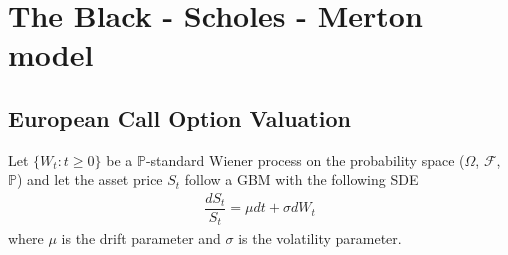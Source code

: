 \chapter{The Black - Scholes - Merton model}


\section{European Call Option Valuation}
\fontsize{11pt}{20pt}\selectfont Let $\{W_t : t\geq 0\}$ be a $\mathbb{P}$-standard Wiener process on the probability space ($\Omega$, $\mathcal{F}$, $\mathbb{P}$) and let the asset price $S_t$ follow a GBM with the following SDE \\
\begin{align*}
\dfrac{dS_t}{S_t}=\mu dt+\sigma dW_t
\end{align*}
where $\mu$ is the drift parameter and $\sigma$ is the volatility parameter. \\ \vspace{0.01cm}

